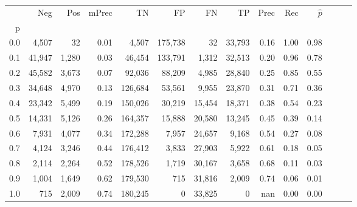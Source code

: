 \begin{tabular}{rrrrrrrrrrrrrr}
\toprule
{} &     Neg &    Pos & mPrec &       TN &       FP &      FN &      TP &  Prec &   Rec & $\hat{p}$ \\
p   &         &        &       &          &          &         &         &       &       &           \\
\midrule
0.0 &   4,507 &     32 &  0.01 &    4,507 &  175,738 &      32 &  33,793 &  0.16 &  1.00 &      0.98 \\
0.1 &  41,947 &  1,280 &  0.03 &   46,454 &  133,791 &   1,312 &  32,513 &  0.20 &  0.96 &      0.78 \\
0.2 &  45,582 &  3,673 &  0.07 &   92,036 &   88,209 &   4,985 &  28,840 &  0.25 &  0.85 &      0.55 \\
0.3 &  34,648 &  4,970 &  0.13 &  126,684 &   53,561 &   9,955 &  23,870 &  0.31 &  0.71 &      0.36 \\
0.4 &  23,342 &  5,499 &  0.19 &  150,026 &   30,219 &  15,454 &  18,371 &  0.38 &  0.54 &      0.23 \\
0.5 &  14,331 &  5,126 &  0.26 &  164,357 &   15,888 &  20,580 &  13,245 &  0.45 &  0.39 &      0.14 \\
0.6 &   7,931 &  4,077 &  0.34 &  172,288 &    7,957 &  24,657 &   9,168 &  0.54 &  0.27 &      0.08 \\
0.7 &   4,124 &  3,246 &  0.44 &  176,412 &    3,833 &  27,903 &   5,922 &  0.61 &  0.18 &      0.05 \\
0.8 &   2,114 &  2,264 &  0.52 &  178,526 &    1,719 &  30,167 &   3,658 &  0.68 &  0.11 &      0.03 \\
0.9 &   1,004 &  1,649 &  0.62 &  179,530 &      715 &  31,816 &   2,009 &  0.74 &  0.06 &      0.01 \\
1.0 &     715 &  2,009 &  0.74 &  180,245 &        0 &  33,825 &       0 &   nan &  0.00 &      0.00 \\
\bottomrule
\end{tabular}

